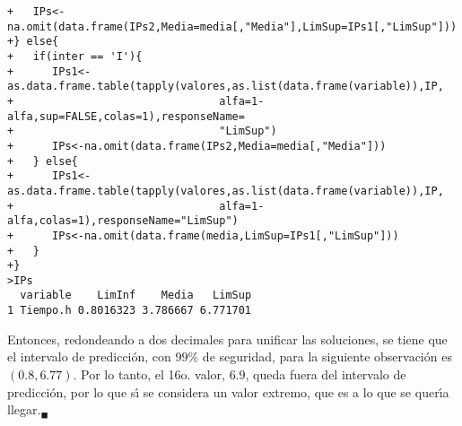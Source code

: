 \begin{solucion}
\begin{verbatim}
+   IPs<-na.omit(data.frame(IPs2,Media=media[,"Media"],LimSup=IPs1[,"LimSup"]))
+} else{
+   if(inter == 'I'){
+      IPs1<-as.data.frame.table(tapply(valores,as.list(data.frame(variable)),IP,
+                                alfa=1-alfa,sup=FALSE,colas=1),responseName=
+                                "LimSup")
+      IPs<-na.omit(data.frame(IPs2,Media=media[,"Media"]))
+   } else{
+      IPs1<-as.data.frame.table(tapply(valores,as.list(data.frame(variable)),IP,
+                                alfa=1-alfa,colas=1),responseName="LimSup")
+      IPs<-na.omit(data.frame(media,LimSup=IPs1[,"LimSup"]))
+   }
+}
>IPs
  variable    LimInf    Media   LimSup
1 Tiempo.h 0.8016323 3.786667 6.771701
 \end{verbatim}
 \vspace{-0.5cm}
 Entonces, redondeando a dos decimales para unificar las soluciones, se tiene que el intervalo de predicci\'on, con $99\%$ de seguridad, para la siguiente observaci\'on es $(0.8,6.77)$. Por lo tanto, el 16o. valor, $6.9$, queda fuera del intervalo de predicci\'on, por lo que s\'{\i} se considera un valor extremo, que es a lo que se quer\'{\i}a llegar.${}_{\blacksquare}$
\end{solucion}
